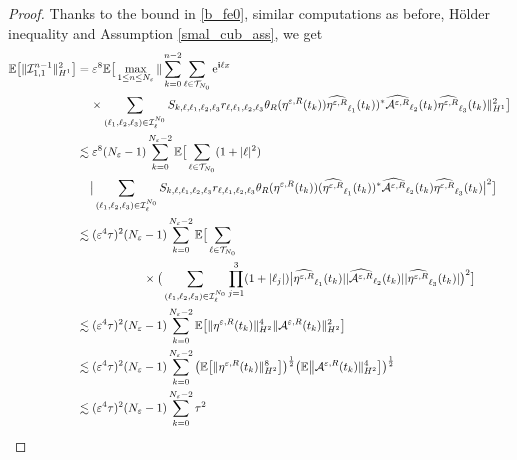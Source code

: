 \documentclass[a4paper]{amsart}
\begin{document}
\begin{proof}
   Thanks to the bound in \eqref{b_fe0}, similar computations as before, Hölder inequality and Assumption \ref{smal_cub_ass}, we get
   \begin{align*}
      \mathbb{E}\big[ \|\mathcal{I}_{1,1}^{n-1} \|^{2}_{H^1}\big]&=\varepsilon^8\mathbb{E}\big[\max_{1\le n\le N_\varepsilon}\|\sum_{k=0}^{n-2}\sum_{\ell\in\mathcal{T}_{N_0}}{\rm e}^{{\bf i}\ell x}\\
      &\hspace{0.4cm}\times\sum_{(\ell_1,\ell_2,\ell_3)\in\mathcal{I}_{\ell}^{N_0}}S_{k,\ell,\ell_1,\ell_2,\ell_3}
    r_{\ell,\ell_1,\ell_2,\ell_3}  \theta_R(\eta^{\varepsilon,R}(t_k)) \widehat{\eta^{\varepsilon,R}}_{\ell_1}(t_k))^* \widehat{\mathcal{A}^{\varepsilon,R}}_{\ell_2} (t_k)\widehat{\eta^{\varepsilon,R}}_{\ell_3}(t_k) \|_{H^1}^{2}\big]\\
    &\lesssim \varepsilon^8 (N_\varepsilon-1)\sum_{k=0}^{N_\varepsilon-2}\mathbb{E}\big[\sum_{\ell\in\mathcal{T}_{N_0}} (1+|\ell|^2)\\
    &\hspace{0.4cm}\big|\sum_{(\ell_1,\ell_2,\ell_3)\in\mathcal{I}_{\ell}^{N_0}}S_{k,\ell,\ell_1,\ell_2,\ell_3}
    r_{\ell,\ell_1,\ell_2,\ell_3}  \theta_R(\eta^{\varepsilon,R}(t_k)) (\widehat{\eta^{\varepsilon,R}}_{\ell_1}(t_k))^* \widehat{\mathcal{A}^{\varepsilon,R}}_{\ell_2} (t_k)\widehat{\eta^{\varepsilon,R}}_{\ell_3}(t_k)\big|^2\big]\\
    &\lesssim (\varepsilon^4 \tau)^{2} (N_\varepsilon-1)\sum_{k=0}^{N_\varepsilon-2}\mathbb{E}\big[\sum_{\ell\in\mathcal{T}_{N_0}}\\
    &\hspace{2cm}\times \big(\sum_{(\ell_1,\ell_2,\ell_3)\in\mathcal{I}_{\ell}^{N_0}}
    \prod_{j=1}^{3}(1+|\ell_j|) \big|\widehat{\eta^{\varepsilon,R}}_{\ell_1}(t_k)| |\widehat{\mathcal{A}^{\varepsilon,R}}_{\ell_2} (t_k)| |\widehat{\eta^{\varepsilon,R}}_{\ell_3}(t_k)|\big)^2\big]\\
    &\lesssim (\varepsilon^4 \tau)^{2} (N_\varepsilon-1)\sum_{k=0}^{N_\varepsilon-2}\mathbb{E}\big[ \|\eta^{\varepsilon,R}(t_k)\|^{4}_{H^2}\|\mathcal{A}^{\varepsilon,R}(t_k)\|^{2}_{H^2}\big]\\
    &\lesssim (\varepsilon^4 \tau)^{2} (N_\varepsilon-1)\sum_{k=0}^{N_\varepsilon-2}\big(\mathbb{E}\big[ \|\eta^{\varepsilon,R}(t_k)\|^{8}_{H^2}\big]\big)^{\frac{1}{2}}\big(\mathbb{E}\big\|\mathcal{A}^{\varepsilon,R}(t_k)\|^{4}_{H^2}\big]\big)^{\frac{1}{2}}\\
    &\lesssim  (\varepsilon^4 \tau)^{2} (N_\varepsilon-1)\sum_{k=0}^{N_\varepsilon-2} \tau^{2}\\

\end{align*}
\end{proof}
\end{document}
